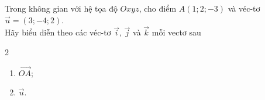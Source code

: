 \begin{bt}%
	Trong không gian với hệ tọa độ $Oxyz$, cho điểm $A(1; 2;-3)$ và véc-tơ $\overrightarrow{u}=(3;-4; 2)$.\\
	Hãy biểu diễn theo các véc-tơ $\overrightarrow{i}$, $\overrightarrow{j}$ và $\overrightarrow{k}$ mỗi vectơ sau
	\begin{multicols}{2}
		\begin{enumerate}
			\item $\overrightarrow{OA}$;
			\item $\overrightarrow{u}$.
		\end{enumerate}
	\end{multicols}	
\end{bt}

